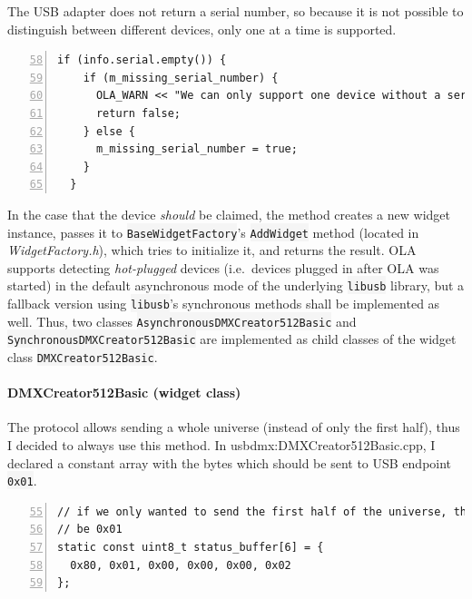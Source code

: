 The USB adapter does not return a serial number, so because it is not
possible to distinguish between different devices, only one at a time is
supported.

\begin{lstlisting}[numbers=left, style=myCpp, firstnumber=58]
  if (info.serial.empty()) {
    if (m_missing_serial_number) {
      OLA_WARN << "We can only support one device without a serial number.";
      return false;
    } else {
      m_missing_serial_number = true;
    }
  }
\end{lstlisting}

In the case that the device \emph{should} be claimed, the method creates
a new widget instance, passes it to \colorbox{WhiteSmoke}{\lstinline!BaseWidgetFactory!}'s
\colorbox{WhiteSmoke}{\lstinline!AddWidget!} method (located in \emph{WidgetFactory.h}), which
tries to initialize it, and returns the result. OLA supports detecting
\emph{hot-plugged} devices (i.e.~devices plugged in after OLA was
started) in the default asynchronous mode of the underlying
\colorbox{WhiteSmoke}{\lstinline!libusb!} library, but a fallback version using
\colorbox{WhiteSmoke}{\lstinline!libusb!}'s synchronous methods shall be implemented as well.
Thus, two classes \colorbox{WhiteSmoke}{\lstinline!AsynchronousDMXCreator512Basic!} and
\colorbox{WhiteSmoke}{\lstinline!SynchronousDMXCreator512Basic!} are implemented as child
classes of the widget class
\colorbox{WhiteSmoke}{\lstinline!DMXCreator512Basic!}.

\paragraph{DMXCreator512Basic (widget
class)}\label{dmxcreator512basic-widget-class}

The protocol allows
sending a whole universe (instead of only the first half), thus I
decided to always use this method. In
\gls{usbdmx:DMXCreator512Basic.cpp}, I declared a constant array with
the bytes which should be sent to USB endpoint \colorbox{WhiteSmoke}{\lstinline!0x01!}.

\begin{lstlisting}[numbers=left, style=myCpp, firstnumber=55, caption={[Excerpt from \glsfont{DMXCreator512Basic.cpp}]Excerpt from \gls{usbdmx:DMXCreator512Basic.cpp}.}]
// if we only wanted to send the first half of the universe, the last byte would
// be 0x01
static const uint8_t status_buffer[6] = {
  0x80, 0x01, 0x00, 0x00, 0x00, 0x02
};
\end{lstlisting}

